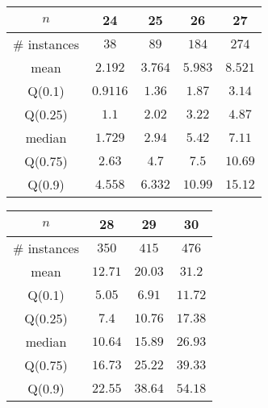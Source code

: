 \begin{tabular}{c|cccc} 
\hline 
$n$ & 24 & 25 & 26 & 27 \tabularnewline 
\hline 
\hline 
\# instances & $38$ & $89$ & $184$ & $274$ \tabularnewline 
mean & $2.192$ & $3.764$ & $5.983$ & $8.521$ \tabularnewline 
Q(0.1) & $0.9116$ & $1.36$ & $1.87$ & $3.14$ \tabularnewline 
Q(0.25) & $1.1$ & $2.02$ & $3.22$ & $4.87$ \tabularnewline 
median & $1.729$ & $2.94$ & $5.42$ & $7.11$ \tabularnewline 
Q(0.75) & $2.63$ & $4.7$ & $7.5$ & $10.69$ \tabularnewline 
Q(0.9) & $4.558$ & $6.332$ & $10.99$ & $15.12$ \tabularnewline 
\hline 
\end{tabular} 
\medskip{} 

\begin{tabular}{c|ccc} 
\hline 
$n$ & 28 & 29 & 30 \tabularnewline 
\hline 
\hline 
\# instances & $350$ & $415$ & $476$ \tabularnewline 
mean & $12.71$ & $20.03$ & $31.2$ \tabularnewline 
Q(0.1) & $5.05$ & $6.91$ & $11.72$ \tabularnewline 
Q(0.25) & $7.4$ & $10.76$ & $17.38$ \tabularnewline 
median & $10.64$ & $15.89$ & $26.93$ \tabularnewline 
Q(0.75) & $16.73$ & $25.22$ & $39.33$ \tabularnewline 
Q(0.9) & $22.55$ & $38.64$ & $54.18$ \tabularnewline 
\hline 
\end{tabular} 
\medskip{} 


